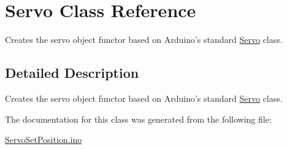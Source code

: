 \hypertarget{class_servo}{\section{Servo Class Reference}
\label{class_servo}
}


Creates the servo object functor based on Arduino's standard \hyperlink{class_servo}{Servo} class.  




\subsection{Detailed Description}
Creates the servo object functor based on Arduino's standard \hyperlink{class_servo}{Servo} class. 

The documentation for this class was generated from the following file\-:\begin{DoxyCompactItemize}
\item 
\hyperlink{_servo_set_position_8ino}{Servo\-Set\-Position.\-ino}\end{DoxyCompactItemize}
